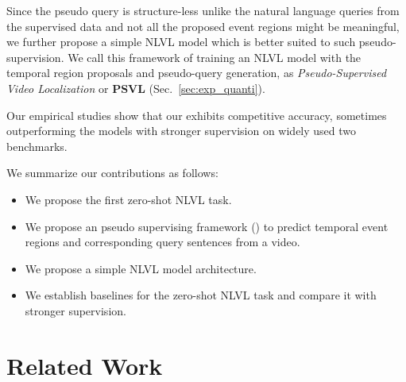 Since the pseudo query is structure-less unlike the natural language queries from the supervised data and not all the proposed event regions might be meaningful, we further propose a simple NLVL model which is better suited to such pseudo-supervision.
We call this framework of training an NLVL model with the temporal region proposals and pseudo-query generation, as \emph{Pseudo-Supervised Video Localization} or \textbf{PSVL} (Sec.~\ref{sec:exp_quanti}).

Our empirical studies show that our \method exhibits competitive accuracy, sometimes outperforming the models with stronger supervision on widely used two benchmarks.

We summarize our contributions as follows:
\vspace{-0.5em}
\begin{itemize}
\setlength\itemsep{-0.5em}
    \item We propose the first zero-shot NLVL task. %
    \item We propose an pseudo supervising framework (\method) to predict temporal event regions and corresponding query sentences from a video.
    \item We propose a simple NLVL model architecture. %
    \item We establish baselines for the zero-shot NLVL task and compare it with stronger supervision. %
\end{itemize}



\section{Related Work}


